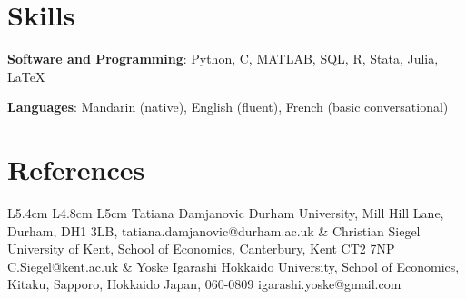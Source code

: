 \documentclass[11pt]{article}
\begin{document}


\section*{Skills}

\textbf{Software and Programming}: Python, C, MATLAB, SQL, R, Stata, Julia, LaTeX

\vspace{0.3em}

\textbf{Languages}: Mandarin (native), English (fluent), French (basic conversational)

\section*{References}

\begin{center}

\begin{tabular}{L{5.4cm}   L{4.8cm}   L{5cm}}
Tatiana Damjanovic \newline
Durham University, \newline
Mill Hill Lane, \newline
Durham, \newline
DH1 3LB,\newline
\small{tatiana.damjanovic@durham.ac.uk}  &
Christian Siegel \newline
University of Kent, \newline
School of Economics, \newline
Canterbury, Kent \newline
CT2 7NP \newline
\small{C.Siegel@kent.ac.uk} &
Yoske Igarashi \newline
Hokkaido University, \newline
School of Economics, \newline
Kitaku, Sapporo, Hokkaido\newline
Japan, 060-0809 \newline
\small{igarashi.yoske@gmail.com} \\
\end{tabular}

\end{center}
\end{document}
